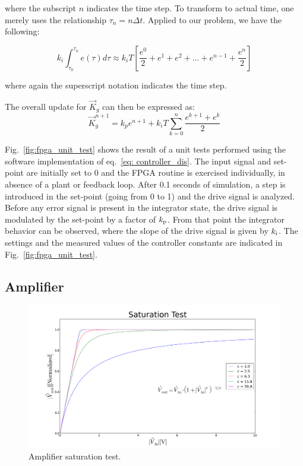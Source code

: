 \documentclass[a4paper,12pt]{article}
\newcommand{\be}{\begin{equation}}
\newcommand{\ee}{\end{equation}}
\begin{document}
\noindent where the subscript $n$ indicates the time step. To transform to actual time, one merely uses the relationship $\tau_{n} = n\Delta t$. Applied to our problem, we have the following: 

\be
k_{i} \int_{\tau_{0}}^{\tau_{n}} e(\tau)d\tau \approx k_{i}T
	      \left[\frac{e^{0}}{2} + e^{1} + e^{2} + ... 
		+ e^{n-1} + \frac{e^{n}}{2} \right]
\ee

\noindent where again the superscript notation indicates the time step. 

The overall update for $\vec{K}_{g}$ can then be expressed as:
\be \label{eq: controller_dis}
\vec{K}_{g}^{n+1} = k_{p} e^{n+1} + k_{i}T \sum_{k=0}^{n}\frac{e^{k+1}+e^k}{2}
\ee

Fig.~\ref{fig:fpga_unit_test} shows the result of a unit tests performed using the software implementation of eq.~\ref{eq: controller_dis}. The input signal and set-point are initially set to 0 and the FPGA routine is exercised individually, in absence of a plant or feedback loop. After 0.1 seconds of simulation, a step is introduced in the set-point (going from 0 to 1) and the drive signal is analyzed. Before any error signal is present in the integrator state, the drive signal is modulated by the set-point by a factor of $k_{\rm p}$. From that point the integrator behavior can be observed, where the slope of the drive signal is given by $k_{\rm i}$. The settings and the measured values of the controller constants are indicated in Fig.~\ref{fig:fpga_unit_test}. 

\subsection{Amplifier}

\begin{figure}
\centering
\includegraphics[scale=0.35]{../figures/saturation_test.png}
\caption{Amplifier saturation test.}
\label{fig:saturation_test}
\end{figure}
\end{document}
